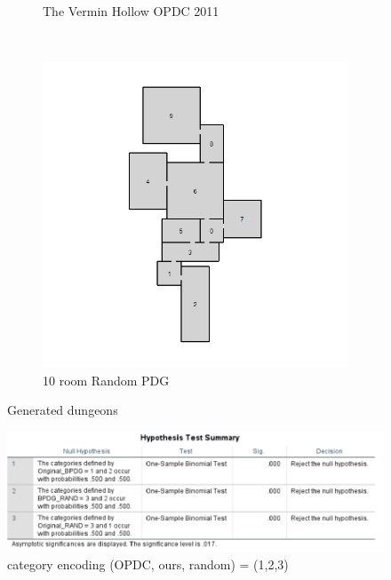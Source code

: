 \documentclass{UoYCSproject}
\begin{document}
\begin{figure}[htb]
\begin{subfigure}[b]{0.45\textwidth}
    \caption{The Vermin Hollow OPDC 2011}
  \end{subfigure}
  ~
  \begin{subfigure}[b]{0.45\textwidth}
    \centering
    \includegraphics[width=\textwidth]{figures/generated/RAND_10_6.jpg}
    \caption{10 room Random PDG}
  \end{subfigure}
  \caption{Generated dungeons}
  \label{fig:gen_dungeons}
\end{figure}

\begin{figure}[htb]
  \centering
  \includegraphics[width=\textwidth]{ExternalValidation/hypothesis_test_summary.png}
  \caption{category encoding (OPDC, ours, random) = (1,2,3)}
  \label{fig:binomial_test_summary}
\end{figure}
\end{document}
